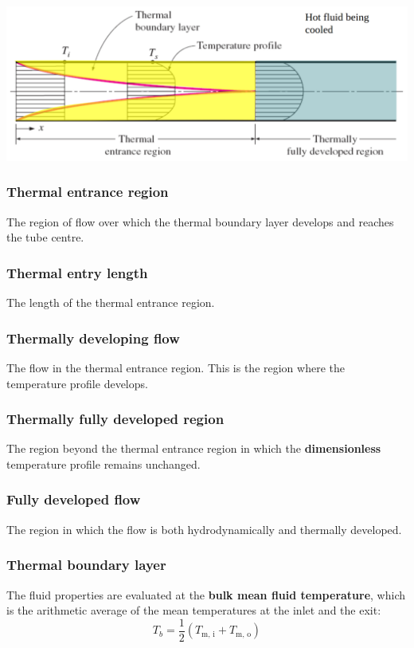 \documentclass[11pt]{article}
\begin{document}
\begin{center}
\includegraphics[width=.9\linewidth]{./images/thermal-entrance-region-diagram.png}
\end{center}
\subsubsection{Thermal entrance region}
\label{sec:org3c577ce}
The region of flow over which the thermal boundary layer develops and reaches the tube centre.
\subsubsection{Thermal entry length}
\label{sec:org909f920}
The length of the thermal entrance region.
\subsubsection{Thermally developing flow}
\label{sec:org2a273a0}
The flow in the thermal entrance region. This is the region where the temperature profile develops.
\subsubsection{Thermally fully developed region}
\label{sec:org2b3506e}
The region beyond the thermal entrance region in which the \textbf{dimensionless} temperature profile remains unchanged.
\subsubsection{Fully developed flow}
\label{sec:org4b4a017}
The region in which the flow is both hydrodynamically and thermally developed.
\subsubsection{Thermal boundary layer}
\label{sec:org3ca19ef}
The fluid properties are evaluated at the \textbf{bulk mean fluid temperature}, which is the arithmetic average of the mean temperatures at the inlet and the exit:
\[T_b = \frac{1}{2} (T_{\text{m, i}} + T_{\text{m, o}})\]
\end{document}
